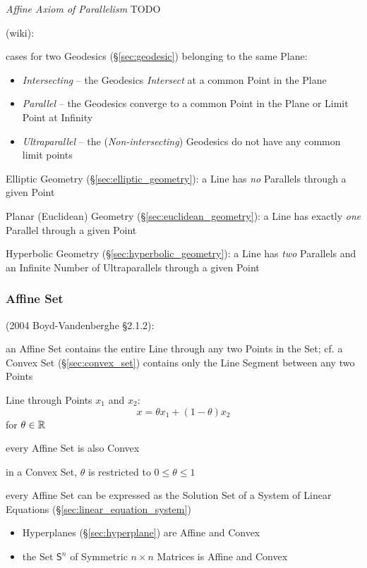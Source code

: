 \emph{Affine Axiom of Parallelism} TODO

\asterism

(wiki):

cases for two Geodesics (\S\ref{sec:geodesic}) belonging to the same Plane:
\begin{itemize}
  \item \emph{Intersecting} -- the Geodesics \emph{Intersect} at a common Point
    in the Plane
  \item \emph{Parallel} -- the Geodesics converge to a common Point in the Plane
    or Limit Point at Infinity
  \item \emph{Ultraparallel} -- the (\emph{Non-intersecting}) Geodesics do not
    have any common limit points
\end{itemize}

\asterism

\fist Elliptic Geometry (\S\ref{sec:elliptic_geometry}): a Line has \emph{no}
  Parallels through a given Point

\fist Planar (Euclidean) Geometry (\S\ref{sec:euclidean_geometry}): a Line has
  exactly \emph{one} Parallel through a given Point

\fist Hyperbolic Geometry (\S\ref{sec:hyperbolic_geometry}): a Line has
\emph{two} Parallels and an Infinite Number of Ultraparallels through a
given Point



\subsubsection{Affine Set}\label{sec:affine_set}

(2004 Boyd-Vandenberghe \S2.1.2):

an Affine Set contains the entire Line through any two Points in the Set; cf. a
Convex Set (\S\ref{sec:convex_set}) contains only the Line Segment between any
two Points

Line through Points $x_1$ and $x_2$:
\[
  x = \theta x_1 + (1-\theta) x_2
\]
for $\theta \in \mathbb{R}$

every Affine Set is also Convex

\fist in a Convex Set, $\theta$ is restricted to $0 \leq \theta \leq 1$

every Affine Set can be expressed as the Solution Set of a System of Linear
Equations (\S\ref{sec:linear_equation_system})

\begin{itemize}
  \item Hyperplanes (\S\ref{sec:hyperplane}) are Affine and Convex
  \item the Set $\mathsf{S}^n$ of Symmetric $n \times n$ Matrices is Affine and
    Convex
\end{itemize}

